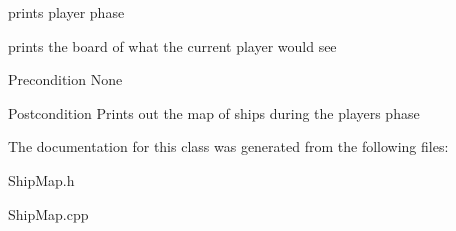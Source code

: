 prints player phase

prints the board of what the current player would see \begin{DoxyPrecond}{Precondition}
None 
\end{DoxyPrecond}
\begin{DoxyPostcond}{Postcondition}
Prints out the map of ships during the player\textquotesingle{}s phase 
\end{DoxyPostcond}


The documentation for this class was generated from the following files\+:\begin{DoxyCompactItemize}
\item 
Ship\+Map.\+h\item 
Ship\+Map.\+cpp\end{DoxyCompactItemize}
